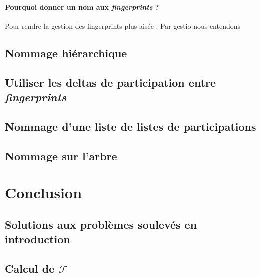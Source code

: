 \documentclass[a4paper]{article}
\begin{document}
\paragraph{Pourquoi donner un nom aux \emph{fingerprints} ?} Pour
rendre la gestion des fingerprints plus aisée \cite{amir, karp}. Par gestio nous entendons

\subsection{Nommage hiérarchique}

\subsection{Utiliser les deltas de participation entre \emph{fingerprints}}

\subsection{Nommage d'une liste de listes de participations}

\subsection{Nommage sur l'arbre}

\section{Conclusion}

\subsection{Solutions aux problèmes soulevés en introduction}

\subsection{Calcul de $\mathcal{F}$}



\end{document}

